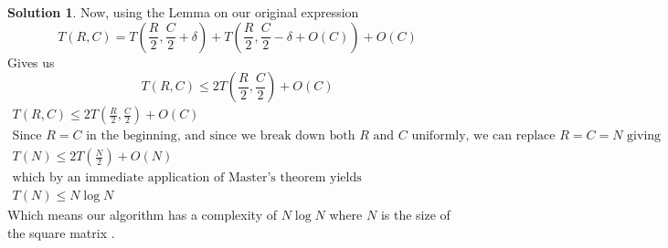 \documentclass{article}
\theoremstyle{definition}
\newtheorem*{solution}{Solution}
\begin{document}
\begin{solution}
Now, using the Lemma on our original expression
$$
T(R, C) = T\left(\frac{R}{2}, \frac{C}{2} + \delta\right) + T\left(\frac{R}{2}, \frac{C}{2} - \delta + O(C) \right) + O(C)
$$
Gives us
$$
T(R, C) \leq 2 T \left(\frac{R}{2}, \frac{C}{2} \right) + O(C)
$$
\begin{gather*}
T(R, C) \leq 2 T \left(\frac{R}{2}, \frac{C}{2} \right) + O(C) \\
\text{Since $R = C$ in the beginning, and since we break down both $R$ and $C$ uniformly, we can replace $R = C = N$ giving} \\
T(N) \leq  2 T \left( \frac{N}{2} \right) + O(N) \\
\text{which by an immediate application of Master's theorem yields} \\
T(N) \leq N \log N
\end{gather*}
Which means our algorithm has a complexity of $N \log N$ where $N$ is the size of the square matrix .
\end{solution}
\end{document}
